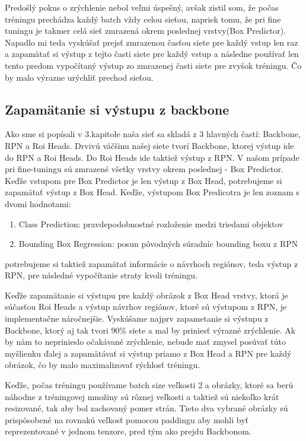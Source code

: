Predošlý pokus o zrýchlenie nebol veľmi úspešný, avšak zistil som, že počas tréningu prechádza každý batch vždy celou sieťou, napriek tomu, že pri fine tuningu je takmer celá sieť zmrazená okrem poslednej vrstvy(Box Predictor). Napadlo mi teda vyskúšať prejsť zmrazenou časťou siete pre každý vstup len raz a zapamätať si výstup z tejto časti siete pre každý vstup a následne používať len tento predom vypočítaný výstup zo zmrazenej časti siete pre zvyšok tréningu. Čo by malo výrazne urýchliť prechod sieťou.

\subsection{Zapamätanie si výstupu z backbone}

Ako sme si popísali v 3.kapitole naša sieť sa skladá z 3 hlavných častí: Backbone, RPN a Roi Heads. Drvivú väčšinu našej siete tvorí Backbone, ktorej výstup ide do RPN a Roi Heads. Do Roi Heads ide taktiež výstup z RPN. V našom prípade pri fine-tuningu sú zmrazené všetky vrstvy okrem poslednej - Box Predictor. Keďže vstupom pre Box Predictor je len výstup z Box Head, potrebujeme si zapamätať výstup z Box Head. Keďže, výstupom Box Predicotra je len zoznam s dvomi hodnotami:  

\begin{enumerate}
  \item Class Prediction: pravdepodobnostné rozloženie medzi triedami objektov
  \item Bounding Box Regression: posun pôvodných súradníc bounding boxu z RPN 
\end{enumerate}

potrebujeme si taktiež zapamätať informácie o návrhoch regiónov, teda výstup z RPN, pre následné vypočítanie straty kvoli tréningu.

Keďže zapamätanie si výstupu pre každý obrázok z Box Head vrstvy, ktorá je súčasťou Roi Heads a výstup návrhov regiónov, ktoré sú výstupom z RPN, je implementačne náročnejšie. Vyskúšame najprv zapametanie si výstupu z Backbone, ktorý aj tak tvori 90\% siete a mal by priniesť výrazné zrýchlenie. Ak by nám to neprinieslo očakávané zrýchlenie, nebude mať zmysel posúvať túto myšlienku ďalej a zapamätávať si výstup priamo z Box Head a RPN pre každý obrázok, čo by malo maximalizovať rýchlosť tréningu.

Keďže, počas tréningu používame batch size veľkosti 2 a obrázky, ktoré sa berú náhodne z tréningovej množiny sú rôznej veľkosti a taktiež sú niekoľko krát resizované, tak aby bol zachovaný pomer strán. Tieto dva vybrané obrázky sú prispôsobené na rovnakú veľkosť pomocou paddingu aby mohli byť reprezentované v jednom tenzore, pred tým ako prejdu Backbonom. 

